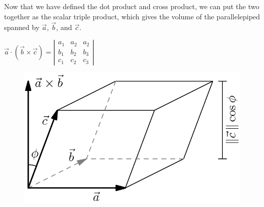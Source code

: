 


\noindent
Now that we have defined the dot product and cross product, we can put the two together as the scalar triple product, which gives the volume of the parallelepiped spanned by $\vec{a}$, $\vec{b}$, and $\vec{c}$.\\
\begin{center}
	$\vec{a}\cdot\left(\vec{b}\times\vec{c}\right) = \left|\begin{matrix}a_1 & a_2 & a_2\\b_1 & b_2 & b_3 \\ c_1 & c_2 & c_3\end{matrix}\right|$
\end{center}

\begin{figure}[h]
	\centering
	\includegraphics[scale=0.29]{Images/backgroundReview/Parallelipiped}
\end{figure}
